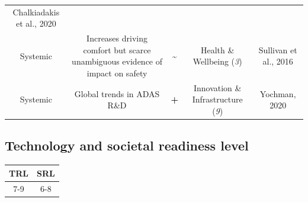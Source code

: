 \documentclass[
]{book}
\begin{document}
\begin{longtable}[]{@{}ccccc@{}}
\begin{minipage}[t]{0.17\columnwidth}
Chalkiadakis et al., 2020\strut
\end{minipage}\tabularnewline
\begin{minipage}[t]{0.17\columnwidth}\centering
Systemic\strut
\end{minipage} & \begin{minipage}[t]{0.16\columnwidth}\centering
Increases driving comfort but scarce unambiguous evidence of impact on safety\strut
\end{minipage} & \begin{minipage}[t]{0.17\columnwidth}\centering
\textbf{\textasciitilde{}}\strut
\end{minipage} & \begin{minipage}[t]{0.17\columnwidth}\centering
Health \& Wellbeing (\emph{3})\strut
\end{minipage} & \begin{minipage}[t]{0.17\columnwidth}\centering
Sullivan et al., 2016\strut
\end{minipage}\tabularnewline
\begin{minipage}[t]{0.17\columnwidth}\centering
Systemic\strut
\end{minipage} & \begin{minipage}[t]{0.16\columnwidth}\centering
Global trends in ADAS R\&D\strut
\end{minipage} & \begin{minipage}[t]{0.17\columnwidth}\centering
\textbf{+}\strut
\end{minipage} & \begin{minipage}[t]{0.17\columnwidth}\centering
Innovation \& Infrastructure (\emph{9})\strut
\end{minipage} & \begin{minipage}[t]{0.17\columnwidth}\centering
Yochman, 2020\strut
\end{minipage}\tabularnewline
\bottomrule
\end{longtable}

\hypertarget{technology-and-societal-readiness-level-23}{%
\subsection*{Technology and societal readiness level}\label{technology-and-societal-readiness-level-23}}

\begin{longtable}[]{@{}cc@{}}
\toprule
TRL & SRL\tabularnewline
\midrule
\endhead
7-9 & 6-8\tabularnewline
\bottomrule
\end{longtable}
\end{document}
